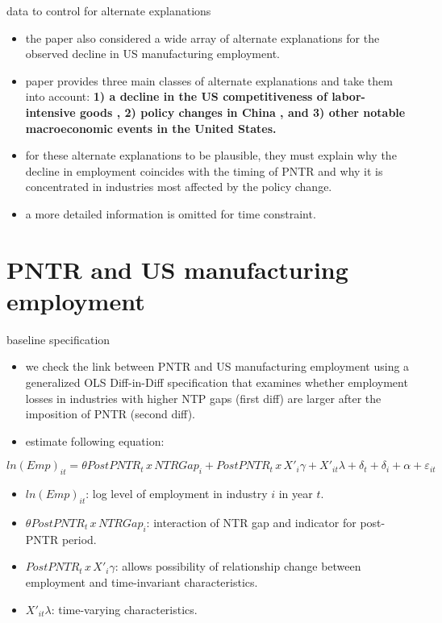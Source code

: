 \documentclass[10pt]{beamer}
\begin{document}
\begin{frame}{data to control for alternate explanations}
	\begin{itemize}
		\item the paper also considered a wide array of alternate explanations for the observed decline in US manufacturing employment. 
		\item paper provides three main classes of alternate explanations and take them into account: \textbf{1) a decline in the US competitiveness of labor-intensive goods \hyperlink{labor}{}, 2) policy changes in China \hyperlink{china}{}, and 3) other notable macroeconomic events in the United States.} \hyperlink{other}{}
		\item for these alternate explanations to be plausible, they must explain why the decline in employment coincides with the timing of PNTR and why it is concentrated in industries most affected by the policy change.
		\item a more detailed information is omitted for time constraint.
	\end{itemize}
\end{frame}

\section{PNTR and US manufacturing employment}

\begin{frame}{baseline specification}
	\begin{itemize}
	\item we check the link between PNTR and US manufacturing employment using a generalized OLS Diff-in-Diff specification that examines whether employment losses in industries with higher NTP gaps (first diff) are larger after the imposition of PNTR (second diff).
	\item estimate following equation:
	\end{itemize}
		$$ln(Emp)_{it}=\theta PostPNTR_t \, x \, NTRGap_i+PostPNTR_t \, x \, X'_i\gamma +X'_{it}\lambda+\delta_t+\delta_i+\alpha+\varepsilon_{it}$$
	\begin{itemize}
	\item $ln(Emp)_{it}$: log level of employment in industry $i$ in year $t$.
	\item $\theta PostPNTR_t \, x \, NTRGap_i$: interaction of NTR gap and indicator for post-PNTR period.
	\item $PostPNTR_t \, x \, X'_i\gamma$: allows possibility of relationship change between employment and time-invariant characteristics.
	\item $X'_{it}\lambda$: time-varying characteristics.
	\end{itemize}
\end{frame}
\end{document}
